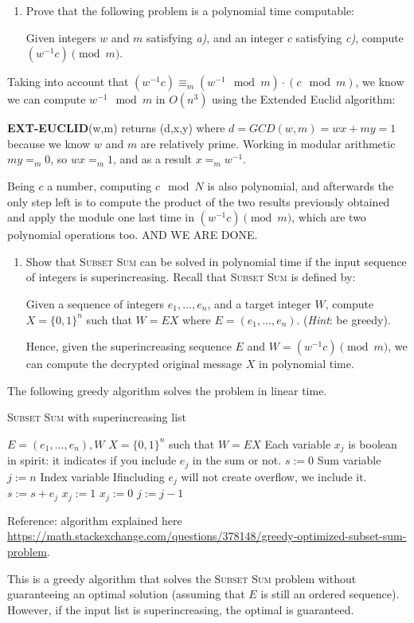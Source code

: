 \documentclass[a4paper]{article}
\begin{document}
\begin{enumerate}[resume, label=\roman*)]
	\item Prove that the following problem is a polynomial time computable:
	
	Given integers $w$ and $m$ satisfying \emph{a)}, and an integer $c$ satisfying \emph{c)}, compute $(w^{-1}c) \pmod{m}$.
\end{enumerate}
Taking into account that $(w^{-1}c)\equiv_m(w^{-1}\mod{m})·(c \mod{m})$, we know we can compute $w^{-1}\mod{m}$ in $O(n^3)$ using the Extended Euclid algorithm:

 \textbf{EXT-EUCLID}(w,m) returns (d,x,y) where $d=GCD(w,m)=wx + my=1$ because we know $w$ and $m$ are relatively prime. Working in modular arithmetic $my=_m0$, so $wx=_m 1$, and as a result $x=_m w^{-1}$.
 
 Being $c$ a number, computing $c \mod{N}$ is also polynomial, and afterwards the only step left is to compute the product of the two results previously obtained and apply the module one last time in $(w^{-1}c) \pmod{m}$, which are two polynomial operations too. AND WE ARE DONE.

\begin{enumerate}[resume, label=\roman*)]
	\item Show that \textsc{Subset Sum} can be solved in polynomial time if the input sequence of integers is superincreasing. Recall that \textsc{Subset Sum} is defined by:
	
	Given a sequence of integers $e_1, ..., e_n$, and a target integer $W$, compute $X = \{0, 1\}^n$ such that $W = EX$ where $E = (e_1, ..., e_n)$. (\emph{Hint}: be greedy).
	
	Hence, given the superincreasing sequence $E$ and $W = (w^{-1}c) \pmod{m}$, we can compute the decrypted original message $X$ in polynomial time.
\end{enumerate}

The following greedy algorithm solves the problem in linear time.

\begin{algorithm}[H]
	\caption{\textsc{Subset Sum} with superincreasing list}
\begin{algorithmic}
	\INPUT $E= (e_1, ... , e_n), W $
	\OUTPUT $ X = \{0,1\}^n $ such that $W=EX$
	\State \Comment Each variable $x_j$ is boolean in spirit: it indicates if you include $e_j$ in the sum or not.
	\State $s := 0$ \Comment Sum variable
	\State $j := n$ \Comment Index variable
		 \Comment Ifincluding  $e_j$ will not create overflow, we include it.
			\State $s := s + e_j$
			\State $x_j := 1$
		\Else
			\State $x_j := 0$
		\EndIf
		\State $ j := j-1 $
	\EndWhile
\end{algorithmic}
\end{algorithm}

Reference: algorithm explained here \rightarrow \url{https://math.stackexchange.com/questions/378148/greedy-optimized-subset-sum-problem}.

This is a greedy algorithm that solves the \textsc{Subset Sum} problem without guaranteeing an optimal solution (assuming that $E$ is still an ordered sequence). However, if the input list is superincreasing, the optimal is guaranteed.
\end{document}
